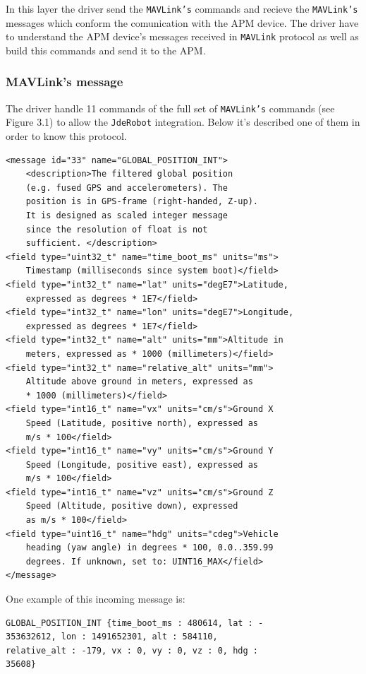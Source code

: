 \documentclass{llncs}
\begin{document}
In this layer the driver send the \texttt{MAVLink's} commands and recieve the \texttt{MAVLink's} messages which conform the comunication with the APM device.
The driver have to understand the APM device's messages received in \texttt{MAVLink} protocol as well as build this commands and send it to the APM.

\subsubsection{MAVLink's message}

The driver handle 11 commands of the full set of \texttt{MAVLink's} commands (see Figure 3.1) to allow the \texttt{JdeRobot} integration. Below it's described one of them in order to know this protocol.

\begin{verbatim}
<message id="33" name="GLOBAL_POSITION_INT">
	<description>The filtered global position 
	(e.g. fused GPS and accelerometers). The 
	position is in GPS-frame (right-handed, Z-up).
	It is designed as scaled integer message 
	since the resolution of float is not 
	sufficient.	</description>
<field type="uint32_t" name="time_boot_ms" units="ms">
	Timestamp (milliseconds since system boot)</field>
<field type="int32_t" name="lat" units="degE7">Latitude, 
	expressed as degrees * 1E7</field>
<field type="int32_t" name="lon" units="degE7">Longitude, 
	expressed as degrees * 1E7</field>
<field type="int32_t" name="alt" units="mm">Altitude in 
	meters, expressed as * 1000 (millimeters)</field>
<field type="int32_t" name="relative_alt" units="mm">
	Altitude above ground in meters, expressed as 
	* 1000 (millimeters)</field>
<field type="int16_t" name="vx" units="cm/s">Ground X 
	Speed (Latitude, positive north), expressed as 
	m/s * 100</field>
<field type="int16_t" name="vy" units="cm/s">Ground Y 
	Speed (Longitude, positive east), expressed as 
	m/s * 100</field>
<field type="int16_t" name="vz" units="cm/s">Ground Z 
	Speed (Altitude, positive down), expressed 
	as m/s * 100</field>
<field type="uint16_t" name="hdg" units="cdeg">Vehicle 
	heading (yaw angle) in degrees * 100, 0.0..359.99 
	degrees. If unknown, set to: UINT16_MAX</field>
</message>
\end{verbatim}

One example of this incoming message is:
\begin{verbatim}
GLOBAL_POSITION_INT {time_boot_ms : 480614, lat : -
353632612, lon : 1491652301, alt : 584110, 
relative_alt : -179, vx : 0, vy : 0, vz : 0, hdg : 
35608}
\end{verbatim}
\end{document}
